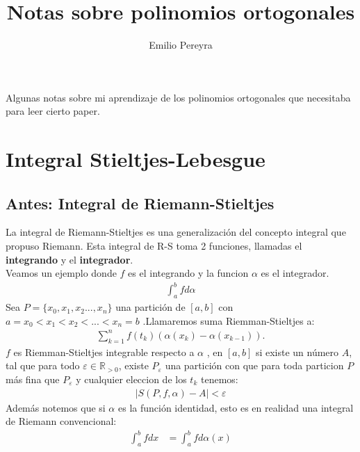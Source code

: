 \documentclass{article}
\title{Notas sobre polinomios ortogonales}
\author{Emilio Pereyra}
\begin{document}
	\begin{titlepage}
	\maketitle
	Algunas notas sobre mi aprendizaje de los polinomios ortogonales que necesitaba 
	para leer cierto paper.
	\end{titlepage}

	\section{Integral Stieltjes-Lebesgue}
	\subsection{Antes: Integral de Riemann-Stieltjes}
	\begin{flushleft}
		La integral de Riemann-Stieltjes es una generalización del concepto
		integral que propuso Riemann.
		Esta integral de R-S toma 2 funciones, llamadas el \textbf{integrando}
		y el \textbf{integrador}.\\
		Veamos un ejemplo donde $f$ es el integrando y la funcion $\alpha$ 
		es el integrador.
		\begin{equation}
			\begin{aligned}
				\int_{a}^{b}f d \alpha
			\end{aligned}
		\end{equation}
		Sea $P=\{x_0,x_1,x_2...,x_n\}$ una partición de $[a,b]$ con 
		$a=x_0<x_1<x_2<...<x_n=b$ .Llamaremos suma Riemman-Stieltjes a:
		\begin{equation}
			\begin{aligned}
				\sum_{k=1}^{n}f(t_k)( \alpha(x_{k}) -  \alpha(x_{k-1})).
			\end{aligned}
		\end{equation}
		$f$ es Riemman-Stieltjes integrable respecto a $\alpha$ ,  en $[a,b]$ si existe 
		un número $A$, tal que para todo $ \varepsilon \in \mathbb{R}_{>0}$, existe $ 
		 P_{\varepsilon}$ una partición con que para toda particion $P$ más fina que 
		 $P_{\varepsilon}$ y cualquier eleccion de los $t_{k}$ tenemos:
		 \begin{equation}
		 	\begin{aligned}
		 		|S(P,f,\alpha)-A| < \varepsilon
		 	\end{aligned}
		 \end{equation}
		 Además notemos que si $ \alpha $  es la función identidad, esto es en realidad una
		 integral de Riemann convencional:
		 \begin{equation}
		 	\begin{aligned}
				\int_{a}^{b}fdx &= \int_{a}^{b}fd \alpha(x)
			\end{aligned}
		 \end{equation}
	\end{flushleft}	
\end{document}
